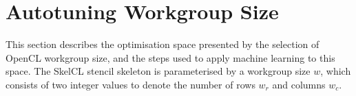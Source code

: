 \documentclass[nonatbib,preprint,10pt]{sigplanconf}
\begin{document}








\section{Autotuning Workgroup Size}

This section describes the optimisation space presented by the
selection of OpenCL workgroup size, and the steps used to apply
machine learning to this space. The SkelCL stencil skeleton is
parameterised by a workgroup size $w$, which consists of two integer
values to denote the number of rows $w_r$ and columns $w_c$.
\end{document}
